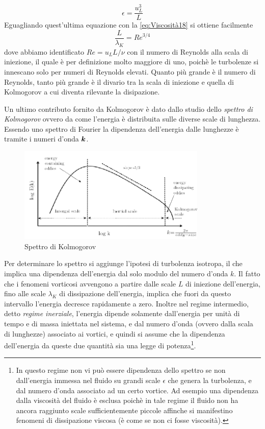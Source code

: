 \begin{equation}
\epsilon = \dfrac{u_L^3}{L}
\end{equation}
Eguagliando quest'ultima equazione con la \ref{eq:Viscosità18} si ottiene facilmente 
\begin{equation}
\dfrac{L}{\lambda_K} = \mathit{Re}^{3/4}
\end{equation}
dove abbiamo identificato $\mathit{Re} = u_L L/\nu$ con il numero di Reynolds alla scala di iniezione, il quale è per definizione molto maggiore di uno, poichè le turbolenze si innescano solo per numeri di Reynolds elevati. Quanto più grande è il numero di Reynolds, tanto più grande è il divario tra la scala di iniezione e quella di Kolmogorov a cui diventa rilevante la disipazione.

Un ultimo contributo fornito da Kolmogorov è dato dallo studio dello \textit{spettro di Kolmogorov} ovvero da come l'energia è distribuita sulle diverse scale di lunghezza. Essendo uno spettro di Fourier la dipendenza dell'energia dalle lunghezze è tramite i numeri d'onda $\V{k}$. 
\begin{figure}
\begin{center}
\includegraphics[width=0.8\textwidth]{img/Kolmogorov}
\caption{Spettro di Kolmogorov}\label{fig:Kolmogorov}
\end{center}
\end{figure}
Per determinare lo spettro si aggiunge l'ipotesi di turbolenza isotropa, il che implica una dipendenza dell'energia dal solo modulo del numero d'onda $k$. Il fatto che i fenomeni vorticosi avvengono a partire dalle scale $L$ di iniezione dell'energia, fino alle scale $\lambda_K$ di dissipazione dell'energia, implica che fuori da questo intervallo l'energia decresce rapidamente a zero. Inoltre nel regime intermedio, detto \textit{regime inerziale}, l'energia dipende solamente dall'energia per unità di tempo e di massa iniettata nel sistema, e dal numero d'onda (ovvero dalla scala di lunghezze) associato ai vortici, e quindi si assume che la dipendenza dell'energia da queste due quantità sia una legge di potenza\footnote{In questo regime non vi può essere dipendenza dello spettro se non dall'energia immessa nel fluido su grandi scale $\epsilon$ che genera la turbolenza, e dal numero d'onda associato ad un certo vortice. Ad esempio una dipendenza dalla viscosità del fluido è esclusa poichè in tale regime il fluido non ha ancora raggiunto scale sufficientemente piccole affinche si manifestino fenomeni di dissipazione viscosa (è come se non ci fosse viscosità).}.
